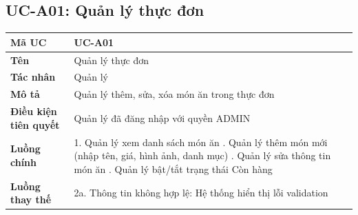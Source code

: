 \documentclass[../20232006p.tex]{subfiles}
\begin{document}
\subsection{UC-A01: Quản lý thực đơn}
\begin{table}[H]
    \centering
    \begin{tabular}{|p{3.5cm}|p{10cm}|}
        \hline
        \textbf{Mã UC}                & UC-A01                                       \\
        \hline
        \textbf{Tên}                  & Quản lý thực đơn                             \\
        \hline
        \textbf{Tác nhân}             & Quản lý                                      \\
        \hline
        \textbf{Mô tả}                & Quản lý thêm, sửa, xóa món ăn trong thực đơn \\
        \hline
        \textbf{Điều kiện tiên quyết} & Quản lý đã đăng nhập với quyền ADMIN         \\
        \hline
        \textbf{Luồng chính}          &
        1. Quản lý xem danh sách món ăn \newline
        2. Quản lý thêm món mới (nhập tên, giá, hình ảnh, danh mục) \newline
        3. Quản lý sửa thông tin món ăn \newline
        4. Quản lý bật/tắt trạng thái Còn hàng                                       \\
        \hline
        \textbf{Luồng thay thế}       &
        2a. Thông tin không hợp lệ: Hệ thống hiển thị lỗi validation                 \\
        \hline
    \end{tabular}
\end{table}
\end{document}
